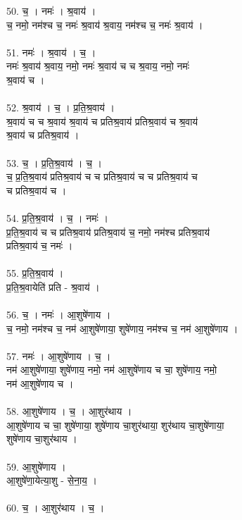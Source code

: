 50. च॒ । नमः॑ । श्र॒वाय॑ ।\\
च॒ नमो॒ नम॑श्च च॒ नमः॑ श्र॒वाय॑ श्र॒वाय॒ नम॑श्च च॒ नमः॑ श्र॒वाय॑ ।\\
\\
51. नमः॑ । श्र॒वाय॑ । च॒ ।\\
नमः॑ श्र॒वाय॑ श्र॒वाय॒ नमो॒ नमः॑ श्र॒वाय॑ च च श्र॒वाय॒ नमो॒ नमः॑\\
श्र॒वाय॑ च ।\\
\\
52. श्र॒वाय॑ । च॒ । प्र॒ति॒श्र॒वाय॑ ।\\
श्र॒वाय॑ च च श्र॒वाय॑ श्र॒वाय॑ च प्रतिश्र॒वाय॑ प्रतिश्र॒वाय॑ च श्र॒वाय॑\\
श्र॒वाय॑ च प्रतिश्र॒वाय॑ ।\\
\\
53. च॒ । प्र॒ति॒श्र॒वाय॑ । च॒ ।\\
च॒ प्र॒ति॒श्र॒वाय॑ प्रतिश्र॒वाय॑ च च प्रतिश्र॒वाय॑ च च प्रतिश्र॒वाय॑ च\\
च प्रतिश्र॒वाय॑ च ।\\
\\
54. प्र॒ति॒श्र॒वाय॑ । च॒ । नमः॑ ।\\
प्र॒ति॒श्र॒वाय॑ च च प्रतिश्र॒वाय॑ प्रतिश्र॒वाय॑ च॒ नमो॒ नम॑श्च प्रतिश्र॒वाय॑\\
प्रतिश्र॒वाय॑ च॒ नमः॑ ।\\
\\
55. प्र॒ति॒श्र॒वाय॑ ।\\
प्र॒ति॒श्र॒वायेति॑ प्रति - श्र॒वाय॑ ।\\
\\
56. च॒ । नमः॑ । आ॒शुषे॑णाय ।\\
च॒ नमो॒ नम॑श्च च॒ नम॑ आ॒शुषे॑णाया॒ शुषे॑णाय॒ नम॑श्च च॒ नम॑ आ॒शुषे॑णाय ।\\
\\
57. नमः॑ । आ॒शुषे॑णाय । च॒ ।\\
नम॑ आ॒शुषे॑णाया॒ शुषे॑णाय॒ नमो॒ नम॑ आ॒शुषे॑णाय च चा॒ शुषे॑णाय॒ नमो॒\\
नम॑ आ॒शुषे॑णाय च ।\\
\\
58. आ॒शुषे॑णाय । च॒ । आ॒शुर॑थाय ।\\
आ॒शुषे॑णाय च चा॒ शुषे॑णाया॒ शुषे॑णाय चा॒शुर॑थाया॒ शुर॑थाय चा॒शुषे॑णाया॒\\
शुषे॑णाय चा॒शुर॑थाय ।\\
\\
59. आ॒शुषे॑णाय ।\\
आ॒शुषे॑णा॒येत्या॒शु - से॒ना॒य॒ ।\\
\\
60. च॒ । आ॒शुर॑थाय । च॒ ।\\
